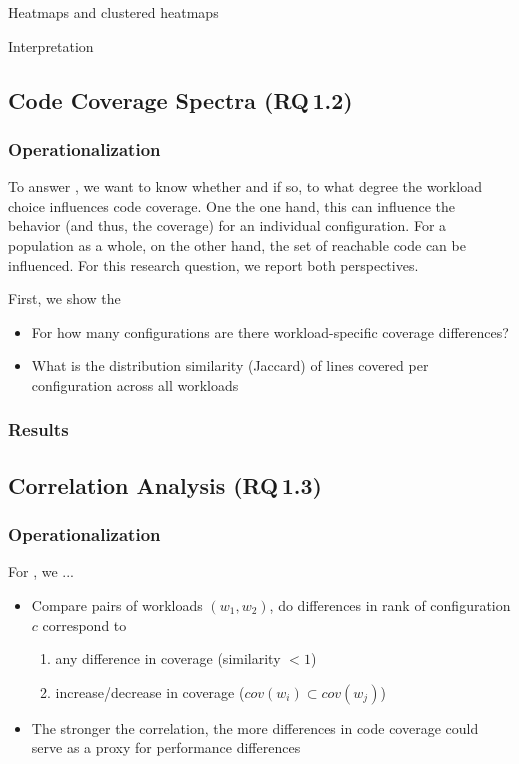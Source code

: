 \begin{compactitem}
	\item Heatmaps and clustered heatmaps
	\item Interpretation
\end{compactitem}

\subsection{Code Coverage Spectra (RQ\,1.2)}\label{sec:coverage_spectra}
\subsubsection{Operationalization}
To answer , we want to know whether and if so, to what degree the workload choice influences code coverage. One the one hand, this can influence the behavior (and thus, the coverage) for an individual configuration. For a population as a whole, on the other hand, the set of reachable code can be influenced. For this research question, we report both perspectives. 

First, we show the 

\begin{itemize}
	\item For how many configurations are there workload-specific coverage differences?
	\item What is the distribution similarity (Jaccard) of lines covered per configuration across all workloads
\end{itemize}

\subsubsection{Results}

\subsection{Correlation Analysis (RQ\,1.3)}\label{sec:performance_coverage_correlation}
\subsubsection{Operationalization}
For , we ...
\begin{itemize}
	\item Compare pairs of workloads $(w_1, w_2)$, do differences in rank of configuration $c$ correspond to 
	\begin{enumerate}
		\item any difference in coverage (similarity $< 1$)
		\item increase/decrease in coverage ($cov(w_i) \subset cov(w_j)$)

	\end{enumerate}
	\item The stronger the correlation, the more differences in code coverage could serve as a proxy for performance differences 
\end{itemize}

